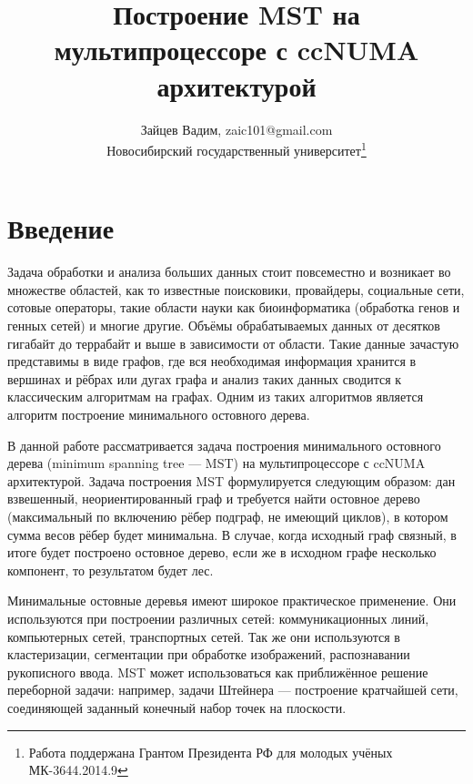 \documentclass{article}
\date{}
\title{Построение MST на мультипроцессоре с ccNUMA архитектурой}
\author{Зайцев Вадим, zaic101@gmail.com \\ Новосибирский государственный университет\thanks{Работа поддержана Грантом Президента РФ для молодых учёных МК-3644.2014.9}}
\begin{document}

\tableofcontents



\newpage
\section{Введение}
Задача обработки и анализа больших данных стоит повсеместно и возникает во множестве областей, как то известные поисковики, провайдеры, социальные сети, сотовые операторы, такие области науки как биоинформатика (обработка генов и генных сетей) и многие другие.
Объёмы обрабатываемых данных от десятков гигабайт до террабайт и выше в зависимости от области.
Такие данные зачастую представимы в виде графов, где вся необходимая информация хранится в вершинах и рёбрах или дугах графа и анализ таких данных сводится к классическим алгоритмам на графах.
Одним из таких алгоритмов является алгоритм построение минимального остовного дерева.

В данной работе рассматривается задача построения минимального остовного дерева (minimum spanning tree --- MST) на мультипроцессоре с ccNUMA архитектурой.
Задача построения MST формулируется следующим образом: дан взвешенный, неориентированный граф и требуется найти остовное дерево (максимальный по включению рёбер подграф, не имеющий циклов), в котором сумма весов рёбер будет минимальна.
В случае, когда исходный граф связный, в итоге будет построено остовное дерево, если же в исходном графе несколько компонент, то результатом будет лес.

Минимальные остовные деревья имеют широкое практическое применение.
Они используются при построении различных сетей: коммуникационных линий, компьютерных сетей, транспортных сетей.
Так же они используются в кластеризации, сегментации при обработке изображений, распознавании рукописного ввода.
MST может использоваться как приближённое решение переборной задачи: например, задачи Штейнера --- построение кратчайшей сети, соединяющей заданный конечный набор точек на плоскости.


\newpage
\end{document}
